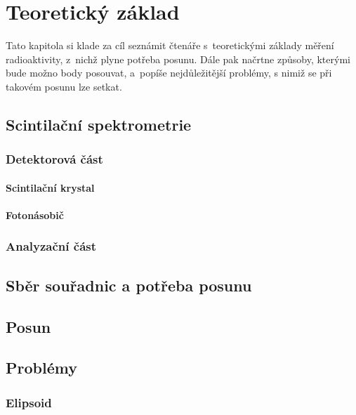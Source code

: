 \chapter{Teoretický základ}
\label{2-teorie}

Tato kapitola si klade za cíl seznámit čtenáře s~teoretickými základy měření radioaktivity, z~nichž
plyne potřeba posunu. Dále pak načrtne způsoby, kterými bude možno body posouvat, a~popíše
nejdůležitější problémy, s nimiž se při takovém posunu lze setkat. 

\section{Scintilační spektrometrie}
\label{spektrometrie}

\subsection{Detektorová část}
\label{detektor}

\subsubsection{Scintilační krystal}
\label{krystal}

\subsubsection{Fotonásobič}
\label{fotonasobic}

\subsection{Analyzační část}
\label{analyzator}


\section{Sběr souřadnic a potřeba posunu}
\label{potreba posunu}


\section{Posun}
\label{posun}


\section{Problémy}
\label{problemy}

\subsection{Elipsoid}
\label{elipsoid}




